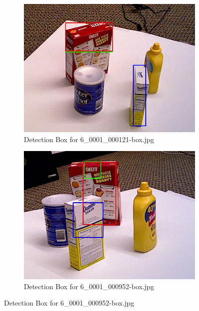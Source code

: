 \documentclass[10.5pt,a4paper]{article}
\begin{document}
\begin{figure} [h]
    \vspace{2em}

    \begin{subfigure}{0.45\textwidth}
        \centering
        \includegraphics[width=\textwidth]{img/6_0001_000121-box.jpg}
        \caption{Detection Box for 6\_0001\_000121-box.jpg}
        \label{fig:img11}
    \end{subfigure}
    \hfill
    \begin{subfigure}{0.45\textwidth}
        \centering
        \includegraphics[width=\textwidth]{img/6_0001_000952-box.jpg}
        \caption{Detection Box for 6\_0001\_000952-box.jpg}
        \label{fig:img12}
    \end{subfigure}
    \end{figure}
\end{document}
